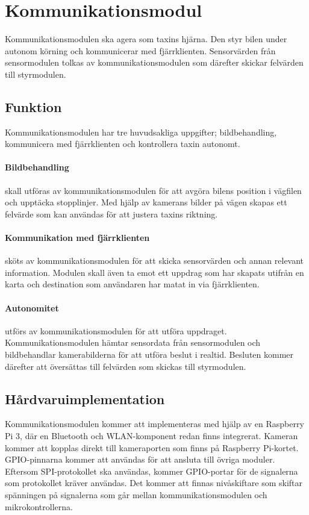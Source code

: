 \documentclass[designspec/spec.tex]{subfiles}
\begin{document}
\section{Kommunikationsmodul}
Kommunikationsmodulen ska agera som taxins hjärna. Den styr bilen under autonom
körning och kommunicerar med fjärrklienten. Sensorvärden från sensormodulen
tolkas av kommunikationsmodulen som därefter skickar felvärden till
styrmodulen.

\subsection{Funktion}
Kommunikationsmodulen har tre huvudsakliga uppgifter; bildbehandling,
kommunicera med fjärrklienten och kontrollera taxin autonomt.

\paragraph{Bildbehandling} skall utföras av kommunikationsmodulen för att
avgöra bilens position i vägfilen och upptäcka stopplinjer. Med hjälp av
kamerans bilder på vägen skapas ett felvärde som kan användas för att justera
taxins riktning.

\paragraph{Kommunikation med fjärrklienten} sköts av kommunikationsmodulen för
att skicka sensorvärden och annan relevant information. Modulen skall även ta
emot ett uppdrag som har skapats utifrån en karta och destination som
användaren har matat in via fjärrklienten.

\paragraph{Autonomitet} utförs av kommunikationsmodulen för att utföra
uppdraget. Kommunikationsmodulen hämtar sensordata från sensormodulen och
bildbehandlar kamerabilderna för att utföra beslut i realtid. Besluten kommer
därefter att översättas till felvärden som skickas till styrmodulen.

\subsection{Hårdvaruimplementation} 
Kommunikationsmodulen kommer att implementeras med hjälp av en Raspberry Pi 3,
där en Bluetooth och WLAN-komponent redan finns integrerat. Kameran kommer att
kopplas direkt till kameraporten som finns på Raspberry Pi-kortet.
GPIO-pinnarna kommer att användas för att ansluta till övriga moduler.
Eftersom SPI-protokollet ska användas, kommer GPIO-portar för de signalerna som
protokollet kräver användas. Det kommer att finnas nivåskiftare som skiftar
spänningen på signalerna som går mellan kommunikationsmodulen och
mikrokontrollerna.
\end{document}
